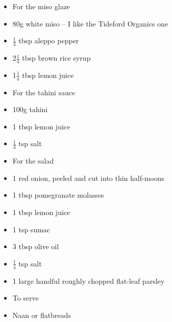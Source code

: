 \documentclass{book}
\begin{document}
\begin{itemize}
\item For the miso glaze
\item 80g white miso – I like the Tideford Organics one
\item $\frac{1}{4}$ tbsp aleppo pepper
\item 2$\frac{1}{4}$ tbsp brown rice syrup
\item 1$\frac{1}{4}$ tbsp lemon juice
\end{itemize}

\begin{itemize}
\item For the tahini sauce
\item 100g tahini
\item 1 tbsp lemon juice
\item $\frac{1}{4}$ tsp salt
\end{itemize}

\begin{itemize}
\item For the salad
\item 1 red onion, peeled and cut into thin half-moons
\item 1 tbsp pomegranate molasses
\item 1 tbsp lemon juice
\item 1 tsp sumac
\item 3 tbsp olive oil
\item $\frac{1}{4}$ tsp salt
\item 1 large handful roughly chopped flat-leaf parsley
\end{itemize}

\begin{itemize}
\item To serve
\item Naan or flatbreads
\end{itemize}
\end{document}
